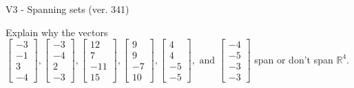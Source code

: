 \begin{exercise}
  \begin{exerciseTitle}V3 - Spanning sets (ver. 341)\end{exerciseTitle}
  \begin{exerciseStatement}
    Explain why the vectors \(\left[\begin{array}{r}
-3 \\
-1 \\
3 \\
-4
\end{array}\right] , \left[\begin{array}{r}
-3 \\
-4 \\
2 \\
-3
\end{array}\right] , \left[\begin{array}{r}
12 \\
7 \\
-11 \\
15
\end{array}\right] , \left[\begin{array}{r}
9 \\
9 \\
-7 \\
10
\end{array}\right] , \left[\begin{array}{r}
4 \\
4 \\
-5 \\
-5
\end{array}\right] , \text{ and } \left[\begin{array}{r}
-4 \\
-5 \\
-3 \\
-3
\end{array}\right]\) span or don't span \(\mathbb{R}^4\). 
	



\end{exerciseStatement}
\end{exercise}

